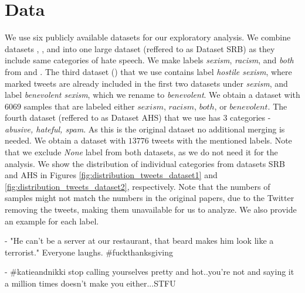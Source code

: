 \documentclass[fleqn,moreauthors,10pt]{ds_report}
\newcommand\bm{0.2pt}
\begin{document}
\section{Data}
\label{sec:data}

We use six publicly available datasets for our exploratory analysis. We combine datasets \cite{waseem2016you}, \cite{rizoiu2019transfer}, and \cite{jha2017does} into one large dataset (reffered to as Dataset SRB) as they include same categories of hate speech. We make labels \textit{sexism}, \textit{racism}, and \textit{both} from \cite{waseem2016you} and \cite{rizoiu2019transfer}. The third dataset (\cite{jha2017does}) that we use contains label \textit{hostile sexism}, where marked tweets are already included in the first two datasets under \textit{sexism}, and label \textit{benevolent sexism}, which we rename to \textit{benevolent}. We obtain a dataset with $6069$ samples that are labeled either $sexism$, $racism$, $both$, or $benevolent$.
The fourth dataset (reffered to as Dataset AHS)\cite{founta2018large} that we use has $3$ categories - \textit{abusive,
hateful, spam}. As this is the original dataset no additional merging is needed. We obtain a dataset with $13776$ tweets with the mentioned labels. Note that we exclude \textit{None} label from both datasets, as we do not need it for the analysis.
We show the distribution of individual categories from datasets SRB and AHS in Figures \ref{fig:distribution_tweets_dataset1} and \ref{fig:distribution_tweets_dataset2}, respectively. Note that the numbers of samples might not match the numbers in the original papers, due to the Twitter removing the tweets, making them unavailable for us to analyze. We also provide an example for each label.

\begin{tcolorbox}[colback=black!8,width=0.9\linewidth, center,arc=8pt,sharp corners=downhill, boxrule=0.3pt, left=\bm, top=\bm, right=\bm, bottom=\bm, fontupper=\small]
 - "He can't be a server at our restaurant, that beard makes him look like a terrorist." Everyone laughs. \#fuckthanksgiving
\end{tcolorbox}

\begin{tcolorbox}[colback=black!8, width=0.9\linewidth, center,arc=8pt,sharp corners=downhill, boxrule=0.3pt, left=\bm, top=\bm, right=\bm, bottom=\bm, fontupper=\small]
 - \#katieandnikki stop calling yourselves pretty and hot..you're not and saying it a million times doesn't make you either...STFU
\end{tcolorbox}
\end{document}
